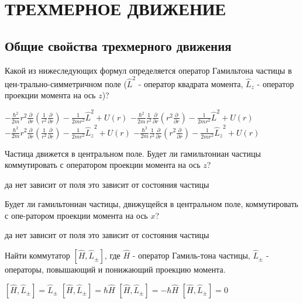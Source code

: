 \documentclass[11pt,a4paper]{exam}
\begin{document}
\section{ ТРЕХМЕРНОЕ ДВИЖЕНИЕ }
\subsection{ Общие свойства трехмерного движения }

\begin{questions}

\question Какой из нижеследующих формул определяется оператор Гамильтона частицы в цен-трально-симметричном поле (${\hat L^2}$ - оператор квадрата момента, ${\hat L_z}$ - оператор проекции момента на ось $z$)?
\begin{choices}
\choice $ - \frac{{{\hbar ^2}}}{{2m}}{r^2}\frac{\partial }{{\partial r}}\left( {\frac{1}{{{r^2}}}\frac{\partial }{{\partial r}}} \right) - \frac{1}{{2m{r^2}}}{\hat L^2} + U(r)$      
\choice $ - \frac{{{\hbar ^2}}}{{2m}}\frac{1}{{{r^2}}}\frac{\partial }{{\partial r}}\left( {{r^2}\frac{\partial }{{\partial r}}} \right) - \frac{1}{{2m{r^2}}}{\hat L^2} + U(r)$   
\choice $ - \frac{{{\hbar ^2}}}{{2m}}{r^2}\frac{\partial }{{\partial r}}\left( {\frac{1}{{{r^2}}}\frac{\partial }{{\partial r}}} \right) - \frac{1}{{2m{r^2}}}{\hat L_z}^2 + U(r)$    
\choice $ - \frac{{{\hbar ^2}}}{{2m}}\frac{1}{{{r^2}}}\frac{\partial }{{\partial r}}\left( {{r^2}\frac{\partial }{{\partial r}}} \right) - \frac{1}{{2m{r^2}}}{\hat L_z}^2 + U(r)$
\end{choices}

\question Частица движется в центральном поле. Будет ли гамильтониан частицы коммутировать с оператором проекции момента на ось $z$?
\begin{choices}
\choice да    
\choice нет      
\choice зависит от поля      
\choice это зависит от состояния частицы
\end{choices}

\question Будет ли гамильтониан частицы, движущейся в центральном поле, коммутировать с опе-ратором проекции момента на ось $x$?
\begin{choices}
\choice да    
\choice нет      
\choice зависит от поля      
\choice это зависит от состояния частицы 
\end{choices}

\question Найти коммутатор $\left[ {\hat H,{{\hat L}_ \pm }} \right]$, где $\hat H$ - оператор Гамиль-тона частицы, ${\hat L_ \pm }$ - операторы, повышающий и понижающий проекцию момента.
\begin{choices}
\choice $\left[ {\hat H,{{\hat L}_ \pm }} \right] = {\hat L_ \pm }$ 
\choice $\left[ {\hat H,{{\hat L}_ \pm }} \right] = \hbar \hat H$   
\choice $\left[ {\hat H,{{\hat L}_ \pm }} \right] =  - \hbar \hat H$   
\choice $\left[ {\hat H,{{\hat L}_ \pm }} \right] = 0$
\end{choices}


\end{questions}
\end{document}
